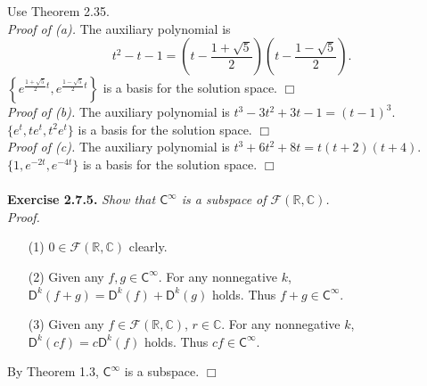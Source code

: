 \documentclass{article}
\begin{document}
Use Theorem 2.35. \\

\emph{Proof of (a).}
The auxiliary polynomial is
$$t^2-t-1 = \left(t-\frac{1+\sqrt{5}}{2}\right)\left(t-\frac{1-\sqrt{5}}{2}\right).$$
$\left\{ e^{\frac{1+\sqrt{5}}{2}t}, e^{\frac{1-\sqrt{5}}{2}t} \right\}$
is a basis for the solution space.
$\Box$ \\

\emph{Proof of (b).}
The auxiliary polynomial is
$t^3-3t^2+3t-1 = (t-1)^3.$
$\{ e^{t}, te^{t}, t^2e^{t} \}$
is a basis for the solution space.
$\Box$ \\

\emph{Proof of (c).}
The auxiliary polynomial is
$t^3+6t^2+8t = t(t+2)(t+4).$
$\{ 1, e^{-2t}, e^{-4t} \}$
is a basis for the solution space.
$\Box$ \\\\






\textbf{Exercise 2.7.5.}
\emph{Show that $\mathsf{C}^{\infty}$ is a subspace of
$\mathcal{F}(\mathbb{R}, \mathbb{C})$. } \\

\emph{Proof.}
\begin{enumerate}
\item[(1)]
$0 \in \mathcal{F}(\mathbb{R}, \mathbb{C})$ clearly.
\item[(2)]
Given any $f, g \in \mathsf{C}^{\infty}$.
For any nonnegative $k$,
$\mathsf{D}^k(f+g) = \mathsf{D}^k(f) + \mathsf{D}^k(g)$ holds.
Thus $f+g \in \mathsf{C}^{\infty}$.
\item[(3)]
Given any $f \in \mathcal{F}(\mathbb{R}, \mathbb{C})$, $r \in \mathbb{C}$.
For any nonnegative $k$,
$\mathsf{D}^k(cf) = c\mathsf{D}^k(f)$ holds.
Thus $cf \in \mathsf{C}^{\infty}$.
\end{enumerate}
By Theorem 1.3, $\mathsf{C}^{\infty}$ is a subspace.
$\Box$ \\\\



\end{document}
